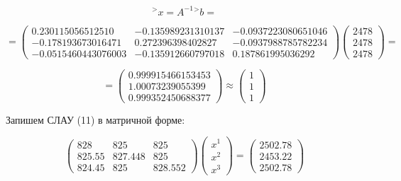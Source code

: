 \documentclass[a4paper, 12pt]{extarticle}
\begin{document}
\begin{equation*}
    ^>x = A^{-1}{^>b} =
\end{equation*}

\begin{equation*}
    = 
    \begin{pmatrix}
        0.230115056512510   & -0.135989231310137 & -0.0937223080651046 \\ 
        -0.178193673016471  & 0.272396398402827  & -0.0937988785782234 \\ 
        -0.0515460443076003 & -0.135912660797018 & 0.187861995036292 
    \end{pmatrix}
    \begin{pmatrix}
        2478 \\ 
        2478 \\ 
        2478 
    \end{pmatrix}
    =
\end{equation*}

\begin{equation}
    =
    \begin{pmatrix}
        0.999915466153453 \\
        1.00073239055399 \\
        0.999352450688377
    \end{pmatrix}
    \approx
    \begin{pmatrix}
        1 \\
        1 \\
        1
    \end{pmatrix}
\end{equation}

Запишем СЛАУ (11) в матричной форме:

\begin{equation}
    \begin{pmatrix}
        828    & 825     & 825 \\ 
        825.55 & 827.448 & 825 \\ 
        824.45 & 825     & 828.552 
    \end{pmatrix}
    \begin{pmatrix}
        x^1 \\ 
        x^2 \\ 
        x^3 
    \end{pmatrix}
    =
    \begin{pmatrix}
        2502.78 \\ 
        2453.22 \\ 
        2502.78 
    \end{pmatrix}
\end{equation}
\end{document}
